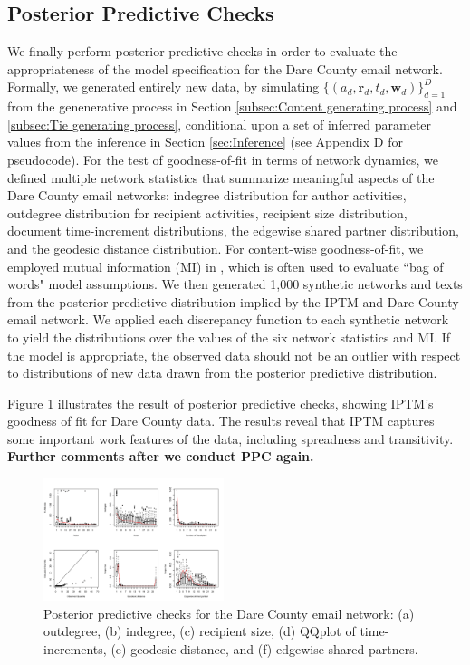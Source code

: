 \documentclass[twoside]{article}
\begin{document}
\subsection{Posterior Predictive Checks}\label{subsec:PPC}
We finally perform posterior predictive checks \cite{rubin1984bayesianly} in order to evaluate the appropriateness of the model specification for the Dare County email network. Formally, we generated entirely new data, by simulating $\{(a_{d}, \boldsymbol{r}_{d}, t_{d}, \boldsymbol{w}_{d})\}_{d=1}^D$ from the genenerative process in Section \ref{subsec:Content generating process} and \ref{subsec:Tie generating process}, conditional upon a set of inferred parameter values from the inference in Section \ref{sec:Inference} (see Appendix D for pseudocode). For the test of goodness-of-fit in terms of network dynamics, we defined multiple network statistics that summarize meaningful aspects of the Dare County email networks: indegree distribution for author activities, outdegree distribution for recipient activities, recipient size distribution, document time-increment distributions, the edgewise shared partner distribution, and the geodesic distance distribution. For content-wise goodness-of-fit, we employed mutual information (MI) in \cite{mimno2011bayesian}, which is often used to evaluate ``bag of words" model assumptions. We then generated 1,000 synthetic networks and texts from the posterior predictive distribution implied by the IPTM and Dare County email network.
We applied each discrepancy function to each synthetic network to yield the distributions over the values of the six network statistics and MI. If the model is appropriate, the observed data should not be an outlier with respect to distributions of new data drawn from the posterior predictive distribution. 

Figure \ref{fig:PPC} illustrates the result of posterior predictive checks, showing IPTM's goodness of fit for Dare County data. The results reveal that IPTM captures some important work features of the data, including spreadness and transitivity. \textbf{Further comments after we conduct PPC again.}
	\begin{figure}[h]
		\centering
		\includegraphics[width = 0.47\textwidth]{plots/PPC_plot-1.png}
		\caption{Posterior predictive checks for the Dare County email network: (a) outdegree, (b) indegree, (c) recipient size, (d) QQplot of time-increments, (e) geodesic distance, and (f) edgewise shared partners.}
		\label{fig:PPC}
	\end{figure}
\end{document}
